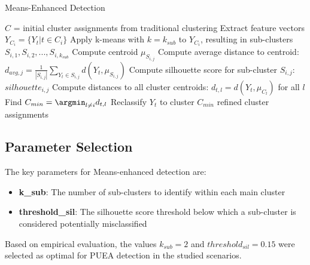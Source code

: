 \begin{algorithm}
\caption{Means-Enhanced Detection}
\label{alg:means_enhanced}
\begin{algorithmic}[1]
    \State $C$ = initial cluster assignments from traditional clustering
         
            \State Extract feature vectors $Y_{C_i} = \{Y_t | t \in C_i\}$
            \State Apply k-means with $k=k_{sub}$ to $Y_{C_i}$, resulting in sub-clusters $S_{i,1}, S_{i,2}, ..., S_{i,k_{sub}}$
                \State Compute centroid $\mu_{S_{i,j}}$
                \State Compute average distance to centroid: $d_{avg,j} = \frac{1}{|S_{i,j}|}\sum_{Y_t \in S_{i,j}} d(Y_t, \mu_{S_{i,j}})$
                \State Compute silhouette score for sub-cluster $S_{i,j}$: $silhouette_{i,j}$
                        \State Compute distances to all cluster centroids: $d_{t,l} = d(Y_t, \mu_{C_l})$ for all $l$
                        \State Find $C_{min} = \argmin_{l \neq i} d_{t,l}$
                            \State Reclassify $Y_t$ to cluster $C_{min}$
                        \EndIf
                    \EndFor
                \EndIf
            \EndFor
        \EndIf
    \EndFor
    \State \Return refined cluster assignments
\EndProcedure
\end{algorithmic}
\end{algorithm}

\subsection{Parameter Selection}

The key parameters for Means-enhanced detection are:
\begin{itemize}
    \item \textbf{k\_sub}: The number of sub-clusters to identify within each main cluster
    \item \textbf{threshold\_sil}: The silhouette score threshold below which a sub-cluster is considered potentially misclassified
\end{itemize}

Based on empirical evaluation, the values $k_{sub}=2$ and $threshold_{sil}=0.15$ were selected as optimal for PUEA detection in the studied scenarios.

